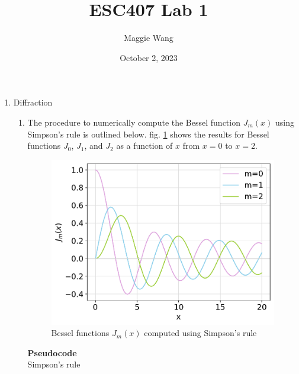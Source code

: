 \documentclass{article}
\newcommand{\code}{\texttt}
\begin{document}
\title{ESC407 Lab 1}

\author{Maggie Wang}

\date{October 2, 2023}
\maketitle

\begin{enumerate}
\item Diffraction
\begin{enumerate}
    \item 
    
    The procedure to numerically compute the Bessel function $J_m(x)$ using Simpson's rule is outlined below. fig. \ref{fig:1a} shows the results for Bessel functions $J_0$, $J_1$, and $J_2$ as a function of $x$ from $x=0$ to $x=2$.
    
    \begin{figure}[H]
        \centering
        \includegraphics[width=0.6\linewidth]{1a.pdf}
        \caption{\label{fig:1a} Bessel functions $J_m(x)$ computed using Simpson's rule}
    \end{figure} 

    \textbf{Pseudocode}\\
    Simpson's rule 


\end{enumerate}
\end{enumerate}
\end{document}
